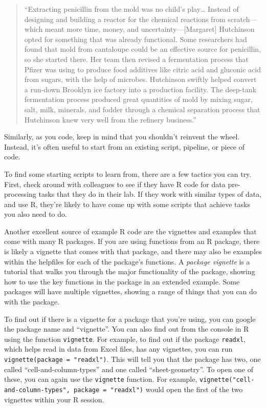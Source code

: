 \documentclass[]{tufte-book}
\begin{document}
\begin{quote}
``Extracting penicillin from the mold was no child's play\ldots{} Instead of
designing and building a reactor for the chemical reactions from scratch---which
meant more time, money, and uncertainty---{[}Margaret{]} Hutchinson opted for
something that was already functional. Some researchers had found that mold from
cantaloupe could be an effective source for penicillin, so she started there.
Her team then revised a fermentation process that Pfizer was using to produce
food additives like citric acid and gluconic acid from sugars, with the help of
microbes. Hutchinson swiftly helped convert a run-down Brooklyn ice factory into
a production facility. The deep-tank fermentation process produced great
quantities of mold by mixing sugar, salt, milk, minerals, and fodder through a
chemical separation process that Hutchinson knew very well from the refinery
business.'' \citep{madhavan2015applied}
\end{quote}

Similarly, as you code, keep in mind that you shouldn't reinvent the wheel.
Instead, it's often useful to start from an existing script, pipeline, or piece
of code.

To find some starting scripts to learn from, there are a few tactics you can
try. First, check around with colleagues to see if they have R code for data
pre-processing tasks that they do in their lab. If they work with similar types
of data, and use R, they're likely to have come up with some scripts that
achieve tasks you also need to do.

Another excellent source of example R code are the vignettes and examples that
come with many R packages. If you are using functions from an R package,
there is likely a vignette that comes with that package, and there may also be
examples within the helpfiles for each of the package's functions. A \emph{package
vignette} is a tutorial that walks you through the major functionality of the
package, showing how to use the key functions in the package in an extended
example. Some packages will have multiple vignettes, showing a range of things
that you can do with the package.

To find out if there is a vignette for a package that you're using, you can
google the package name and ``vignette''. You can also find out from the console
in R using the function \texttt{vignette}. For example, to find out if the package
\texttt{readxl}, which helps read in data from Excel files, has any vignettes, you can
run \texttt{vignette(package\ =\ "readxl")}. This will tell you that the package has two,
one called ``cell-and-column-types'' and one called ``sheet-geometry''. To open one
of these, you can again use the \texttt{vignette} function. For example,
\texttt{vignette("cell-and-column-types",\ package\ =\ "readxl")} would open the first of
the two vignettes within your R session.
\end{document}
